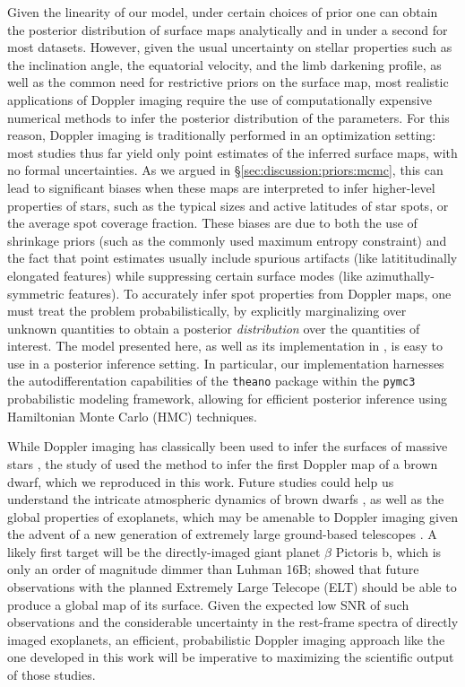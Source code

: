 \documentclass[modern]{aastex631}
\begin{document}
Given the linearity of our model, under certain choices of prior one can obtain the posterior distribution of surface maps analytically and in under a second for most datasets. 
However, given the usual uncertainty on stellar properties such as the inclination angle, the equatorial velocity, and the limb darkening profile, as well as the common need for restrictive priors on the surface map, most realistic applications of Doppler imaging require the use of computationally expensive numerical methods to infer the posterior distribution of the parameters.
For this reason, Doppler imaging is traditionally performed in an optimization setting: most studies thus far yield only point estimates of the inferred surface maps, with no formal uncertainties.
As we argued in \S\ref{sec:discussion:priors:mcmc}, this can lead to significant biases when these maps are interpreted to infer higher-level properties of stars, such as the typical sizes and active latitudes of star spots, or the average spot coverage fraction.
These biases are due to both the use of shrinkage priors (such as the commonly used maximum entropy constraint) and the fact that point estimates usually include spurious artifacts (like latititudinally elongated features) while suppressing certain surface modes (like azimuthally-symmetric features).
To accurately infer spot properties from Doppler maps, one must treat the problem probabilistically, by explicitly marginalizing over unknown quantities to obtain a posterior \emph{distribution} over the quantities of interest.
The model presented here, as well as its implementation in \starry, is easy to use in a posterior inference setting.
In particular, our implementation harnesses the autodifferentation capabilities of the \texttt{theano} \citep{Bergstra2010} package within the \texttt{pymc3} \citep{Salvatier2016} probabilistic modeling framework, allowing for efficient posterior inference using Hamiltonian Monte Carlo (HMC) techniques.

While Doppler imaging has classically been used to infer the surfaces of massive stars , the study of \citet{Crossfield2014} used the method to infer the first Doppler map of a brown dwarf, which we reproduced in this work.
Future studies could help us understand the intricate atmospheric dynamics of brown dwarfs \citep{Tan2021a,Tan2021b}, as well as the global properties of exoplanets, which may be amenable to Doppler imaging given the advent of a new generation of extremely large ground-based telescopes \citep{Crossfield2014b}.
A likely first target will be the directly-imaged giant planet $\beta$ Pictoris b, which is only an order of magnitude dimmer than Luhman 16B; \citet{Snellen2014} showed that future observations with the planned Extremely Large Telecope (ELT) should be able to produce a global map of its surface.
Given the expected low SNR of such observations and the considerable uncertainty in the rest-frame spectra of directly imaged exoplanets, an efficient, probabilistic Doppler imaging approach like the one developed in this work will be imperative to maximizing the scientific output of those studies.
\end{document}
